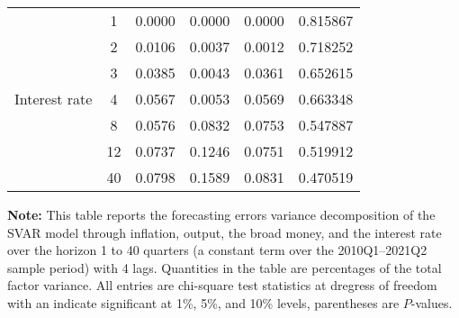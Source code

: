 \begin{table}[H]
{\begin{tabular}{@{}lccccc@{}}
			\multirow{7}{*}{Interest rate} 
			&1  & 0.0000 & 0.0000 & 0.0000   & 0.815867 \\
			&2  & 0.0106 & 0.0037 & 0.0012   & 0.718252 \\
			&3  & 0.0385 & 0.0043 & 0.0361   & 0.652615 \\
			&4  & 0.0567 & 0.0053 & 0.0569   & 0.663348 \\
			&8  & 0.0576 & 0.0832 & 0.0753   & 0.547887 \\
			&12 & 0.0737 & 0.1246 & 0.0751   & 0.519912 \\
			&40 & 0.0798 & 0.1589 & 0.0831   & 0.470519 \\ \hline \hline
		\end{tabular}%
	}
	\begin{tablenotes}
	\footnotesize
	\item \textbf{Note:} This table reports the forecasting errors variance decomposition of the SVAR model through inflation, output, the broad money, and the interest rate over the horizon 1 to 40 quarters (a constant term over the 2010Q1--2021Q2 sample period) with 4 lags. Quantities in the table are percentages of the total factor variance. All entries are chi-square test statistics at dregress of freedom with an indicate significant at 1\%, 5\%, and 10\%  levels, parentheses are $P$-values. 
	\end{tablenotes} 
\end{table}


\begin{table}[]
	\begin{tabular}{lllll}
		
		
		
		
		
		
		
	\end{tabular}
\end{table}
